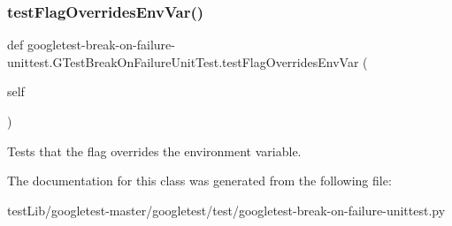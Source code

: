 \subsubsection{\texorpdfstring{test\+Flag\+Overrides\+Env\+Var()}{testFlagOverridesEnvVar()}}
{\footnotesize\ttfamily def googletest-\/break-\/on-\/failure-\/unittest.\+G\+Test\+Break\+On\+Failure\+Unit\+Test.\+test\+Flag\+Overrides\+Env\+Var (\begin{DoxyParamCaption}\item[{}]{self }\end{DoxyParamCaption})}

\begin{DoxyVerb}Tests that the flag overrides the environment variable.\end{DoxyVerb}
 

The documentation for this class was generated from the following file\+:\begin{DoxyCompactItemize}
\item 
test\+Lib/googletest-\/master/googletest/test/googletest-\/break-\/on-\/failure-\/unittest.\+py\end{DoxyCompactItemize}
